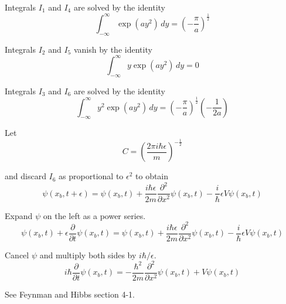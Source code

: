 Integrals $I_1$ and $I_4$ are solved by the identity
\begin{equation*}
\int_{-\infty}^\infty\exp(ay^2)\,dy=\left(-\frac{\pi}{a}\right)^\frac{1}{2}
\end{equation*}

Integrals $I_2$ and $I_5$ vanish by the identity
\begin{equation*}
\int_{-\infty}^\infty y\exp(ay^2)\,dy=0
\end{equation*}

Integrals $I_3$ and $I_6$ are solved by the identity
\begin{equation*}
\int_{-\infty}^\infty y^2\exp(ay^2)\,dy=\left(-\frac{\pi}{a}\right)^\frac{1}{2}\left(-\frac{1}{2a}\right)
\end{equation*}

Let
\begin{equation*}
C=\left(\frac{2\pi i\hbar\epsilon}{m}\right)^{-\frac{1}{2}}
\end{equation*}

and discard $I_6$ as proportional to $\epsilon^2$ to obtain
\begin{equation*}
\psi(x_b,t+\epsilon)=\psi(x_b,t)
+\frac{i\hbar\epsilon}{2m}\frac{\partial^2}{\partial x^2}\psi(x_b,t)
-\frac{i}{\hbar}\epsilon V\psi(x_b,t)
\end{equation*}

Expand $\psi$ on the left as a power series.
\begin{equation*}
\psi(x_b,t)+\epsilon\frac{\partial}{\partial t}\psi(x_b,t)=\psi(x_b,t)
+\frac{i\hbar\epsilon}{2m}\frac{\partial^2}{\partial x^2}\psi(x_b,t)
-\frac{i}{\hbar}\epsilon V\psi(x_b,t)
\end{equation*}

Cancel $\psi$ and multiply both sides by $i\hbar/\epsilon$.
\begin{equation*}
i\hbar\frac{\partial}{\partial t}\psi(x_b,t)
=-\frac{\hbar^2}{2m}\frac{\partial^2}{\partial x^2}\psi(x_b,t)+V\psi(x_b,t)
\end{equation*}

See Feynman and Hibbs section 4-1.


